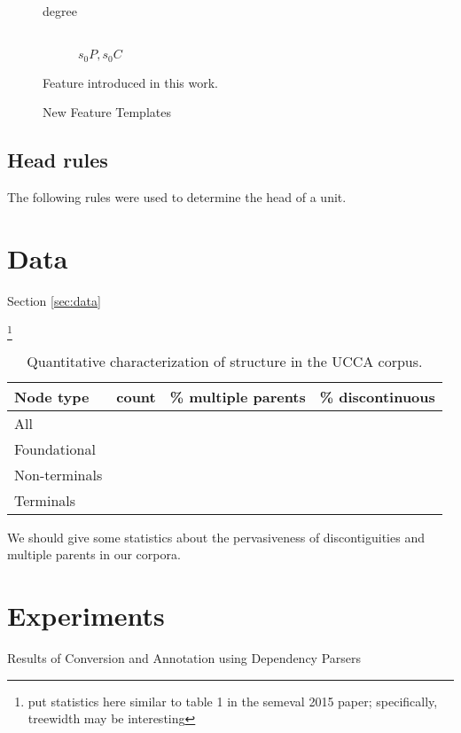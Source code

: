 \documentclass[11pt]{article}
\newcommand{\oa}[1]{\footnote{\color{red} #1}}
\newcommand{\secref}[1]{Section \ref{#1}}
\begin{document}
\begin{figure}[t]
\begin{description}
	\item[degree] \hfill \\
	$s_0P, s_0C$
\end{description}
\caption{New Feature Templates}
\medskip
\small
Feature introduced in this work.
\label{fig:new_features}
\end{figure}

\subsection{Head rules}
\label{subsec:head_rules}

The following rules were used to determine the head of a unit.

\section{Data}\secref{sec:data}

\oa{put statistics here similar to table 1 in the semeval 2015 paper; specifically, treewidth may be interesting}

\begin{table}[ht]
\begin{tabular}{lccc}
Node type & count & \% multiple parents & \% discontinuous \\
\hline
All &  & \\
Foundational &  & \\
Non-terminals &  & \\
Terminals &  &
\end{tabular}
\caption{Quantitative characterization of structure in the UCCA corpus. 
}
\end{table}

We should give some statistics about the pervasiveness of discontiguities and multiple parents in our corpora.

\section{Experiments}

\begin{table*}
\caption{Results of Conversion and Annotation using Dependency Parsers}
\label{table:convert}
\end{table*}
\end{document}
